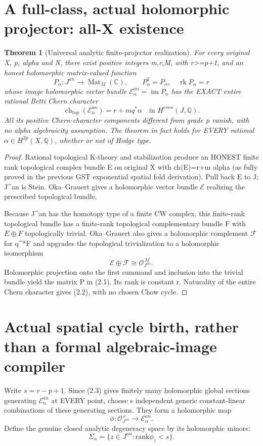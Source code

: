 \documentclass[11pt]{article}
\newtheorem{theorem}{Theorem}[section]
\begin{document}
\section{A full-class, actual holomorphic projector: all-X existence}
\begin{theorem}[Universal analytic finite-projector realization]
For every original X, p, alpha and N, there
exist positive integers m,r,M, with r>=p+1,
and an honest holomorphic matrix-valued
function
\[
  \boxed{
   P_\alpha:J^{an}\longrightarrow
            \operatorname{Mat}_M(\mathbb C),\qquad
   P_\alpha^2=P_\alpha,\quad\operatorname{rk}P_\alpha=r
  }                                                       \tag{2.1}
\]
whose image holomorphic vector bundle
$\mathcal E_\alpha^{an}=\operatorname{im}P_\alpha$
has the EXACT entire rational Betti Chern character
\[
  \boxed{
   \operatorname{ch}_{top}(\mathcal E_\alpha^{an})
     =r+m q^*\alpha \quad\text{in }H^{even}(J,\mathbb Q).
  }                                                       \tag{2.2}
\]
All its positive Chern-character components
different from grade p vanish, with no alpha
algebraicity assumption. The theorem in fact
holds for EVERY rational $\alpha\in H^{2p}(X,\mathbb Q)$,
whether or not of Hodge type.
\end{theorem}
\begin{proof}
Rational topological K-theory and stabilization
produce an HONEST finite rank topological complex
bundle E on original X with ch(E)=r+m alpha
(as fully proved in the previous GST exponential
spatial fold derivation). Pull back E to J;
J^{an} is Stein. Oka--Grauert gives a
holomorphic vector bundle $\mathcal E$
realizing the prescribed topological bundle.

Because J^{an} has the homotopy type of a finite
CW complex, this finite-rank topological bundle
has a finite-rank topological complementary
bundle F with $E\oplus F$ topologically trivial.
Oka--Grauert also gives a holomorphic
complement $\mathcal F$ for q^*F and upgrades
the topological trivialization to a holomorphic
isomorphism
\[
 \mathcal E\oplus\mathcal F
     \cong\mathcal O_{J^{an}}^{\,M}.                 \tag{2.3}
\]
Holomorphic projection onto the first summand
and inclusion into the trivial bundle yield
the matrix P in (2.1). Its rank is constant r.
Naturality of the entire Chern character
gives (2.2), with no chosen Chow cycle.
\end{proof}

\section{Actual spatial cycle birth, rather than a formal algebraic-image compiler}
Write $s=r-p+1$. Since (2.3) gives finitely many
holomorphic global sections generating
$\mathcal E_\alpha^{an}$ at EVERY point,
choose s independent generic constant-linear
combinations of these generating sections.
They form a holomorphic map
\[
 \phi:\mathcal O_{J^{an}}^{\,s}
          \longrightarrow\mathcal E_\alpha^{an}.
\]
Define the genuine closed analytic degeneracy
space by its holomorphic minors:
\[
 \boxed{
 \Sigma_\alpha=\{z\in J^{an}:
                 \mathrm{rank}\phi_z<s\}.
 }                                                       \tag{3.1}
\]
\end{document}
